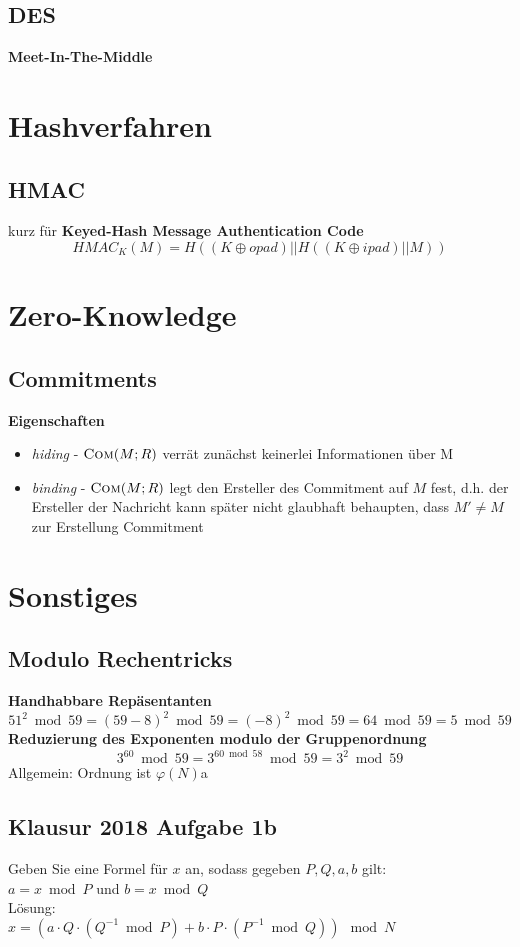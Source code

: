 \documentclass[10pt,a4paper]{article}
\begin{document}
        \subsection{DES}
        \textbf{Meet-In-The-Middle}
        \section{Hashverfahren}
        \subsection{HMAC}
        kurz für \textbf{Keyed-Hash Message Authentication Code} \\
        \[\mathit{HMAC}_{K}(M) = H((K \oplus \mathit{opad}) || H((K \oplus \mathit{ipad}) || M))\]

        \section{Zero-Knowledge}
        \subsection{Commitments}
        \textbf{Eigenschaften}
        \begin{itemize}
        \item \textit{hiding} - \(\textsc{Com}(M; R)\) verrät zunächst keinerlei Informationen über M
        \item \textit{binding} - \(\textsc{Com}(M; R)\) legt den Ersteller des Commitment auf \(M\) fest, d.h.
          der Ersteller der Nachricht kann später nicht glaubhaft behaupten, dass \(M' \neq M\) zur Erstellung
          Commitment
        \end{itemize}
        
        \section{Sonstiges}
        \subsection{Modulo Rechentricks}
        \textbf{Handhabbare Repäsentanten}
        \[51^2 \bmod 59 = (59-8)^2 \bmod 59 = (-8)^2 \bmod 59 = 64 \bmod 59 = 5 \bmod 59\]
        \textbf{Reduzierung des Exponenten modulo der Gruppenordnung}
        \[3^{60} \bmod 59 = 3^{60 \bmod 58} \bmod 59 = 3^2 \bmod 59\]
        Allgemein: Ordnung ist \(\varphi(N)\)a
        \subsection{Klausur 2018 Aufgabe 1b}
        Geben Sie eine Formel für \(x\) an, sodass gegeben \(P, Q, a, b\) gilt:\\
        \(a = x \bmod P\) und \(b = x \bmod Q\)\\
        Lösung:\\
        \(x = ( a \cdot Q  \cdot (Q^{-1} \bmod P) + b \cdot P \cdot (P^{-1} \bmod Q)) \mod N\)
\end{document}
